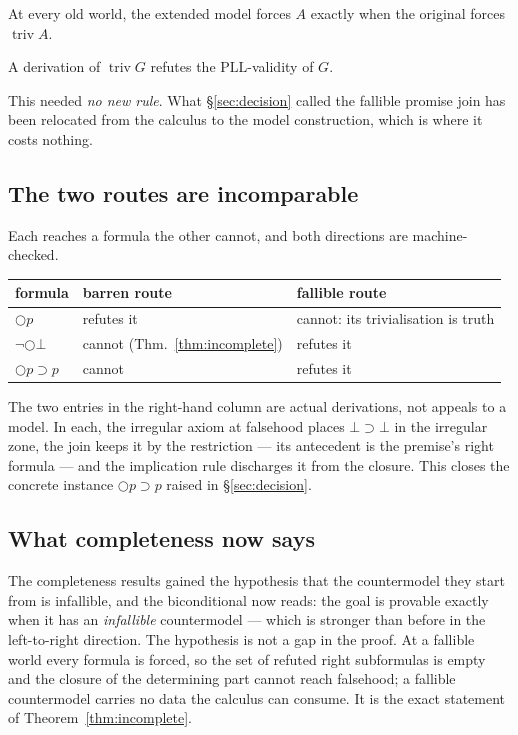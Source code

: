 \documentclass[11pt,a4paper]{article}
\begin{document}
\begin{theorem}\label{thm:falTop}
At every old world, the extended model forces $A$ exactly when the
original forces $\operatorname{triv} A$.
\end{theorem}

\begin{proposition}
A derivation of $\operatorname{triv} G$ refutes the $\mathrm{PLL}$-validity
of $G$.
\end{proposition}

This needed \emph{no new rule}. What \S\ref{sec:decision} called the
fallible promise join has been relocated from the calculus to the model
construction, which is where it costs nothing.

\subsection{The two routes are incomparable}
\label{sec:tworoutes}

Each reaches a formula the other cannot, and both directions are
machine-checked.

\begin{center}
\begin{tabular}{lll}
\hline
formula & barren route & fallible route\\
\hline
$\bigcirc p$ & refutes it & cannot: its trivialisation is truth\\
$\neg\bigcirc\bot$ & cannot (Thm.~\ref{thm:incomplete}) & refutes it\\
$\bigcirc p \supset p$ & cannot & refutes it\\
\hline
\end{tabular}
\end{center}

\noindent
The two entries in the right-hand column are actual derivations, not
appeals to a model. In each, the irregular axiom at falsehood places
$\bot \supset \bot$ in the irregular zone, the join keeps it by the
restriction --- its antecedent is the premise's right formula --- and the
implication rule discharges it from the closure. This closes the concrete
instance $\bigcirc p \supset p$ raised in \S\ref{sec:decision}.

\subsection{What completeness now says}

The completeness results gained the hypothesis that the countermodel they
start from is infallible, and the biconditional now reads: the goal is
provable exactly when it has an \emph{infallible} countermodel --- which
is stronger than before in the left-to-right direction. The hypothesis is
not a gap in the proof. At a fallible world every formula is forced, so
the set of refuted right subformulas is empty and the closure of the
determining part cannot reach falsehood; a fallible countermodel carries
no data the calculus can consume. It is the exact statement of
Theorem~\ref{thm:incomplete}.
\end{document}
